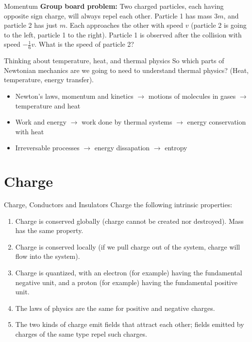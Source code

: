 \documentclass{beamer}
\begin{document}
\begin{frame}{Momentum}
\textbf{Group board problem:}
Two charged particles, each having opposite sign charge, will always repel each other.  Particle 1 has mass $3m$, and particle 2 has just $m$.  Each approaches the other with speed $v$ (particle 2 is going to the left, particle 1 to the right).  Particle 1 is observed after the collision with speed $-\frac{1}{6}v$.  What is the speed of particle 2?
\end{frame}

\begin{frame}{Thinking about temperature, heat, and thermal physics}
So which parts of Newtonian mechanics are we going to need to understand thermal physics? (Heat, temperature, energy transfer).
\begin{itemize}
\item Newton's laws, momentum and kinetics $\rightarrow$ motions of molecules in gases $\rightarrow$ temperature and heat
\item Work and energy $\rightarrow$ work done by thermal systems $\rightarrow$ energy conservation with heat
\item Irreversable processes $\rightarrow$ energy dissapation $\rightarrow$ entropy
\end{itemize}
\end{frame}

\section{Charge}

\begin{frame}{Charge, Conductors and Insulators}
\small
Charge the following intrinsic properties: \\ \vspace{0.25cm}
\begin{enumerate}
\item Charge is conserved globally (charge cannot be created nor destroyed).  Mass has the same property.
\item Charge is conserved locally (if we pull charge out of the system, charge will flow into the system).
\item Charge is quantized, with an electron (for example) having the fundamental negative unit, and a proton (for example) having the fundamental positive unit.
\item The laws of physics are the same for positive and negative charges.
\item The two kinds of charge emit fields that attract each other; fields emitted by charges of the same type repel such charges.
\end{enumerate}
\end{frame}
\end{document}
